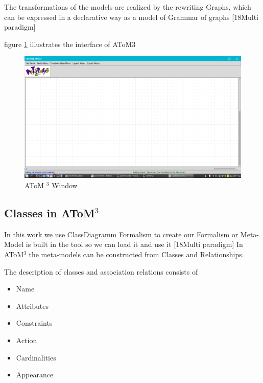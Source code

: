  The transformations of the models are realized by the rewriting
Graphs, which can be expressed in a declarative way as a model of
Grammar of graphs \cite{ch3-meta2}[18Multi paradigm]

 figure \ref{fig:AToM3 Window} illustrates the interface of AToM3 

\begin{figure}[th]
	\centering
		\includegraphics[scale=0.33]{Chapiter3/img/atom3}
	\caption{\label{fig:AToM3 Window}AToM $^{3}$ Window}
\end{figure} 
\pagebreak
\subsection{Classes in AToM$^{3}$ }
In this work we use ClassDiagramm Formalism to create  our Formalism 
or Meta-Model is built in the tool so we can load it and use  it
 \cite{ch3-meta2}[18Multi paradigm]
In AToM$^{3}$ the meta-models can be constructed from Classes and
Relationships.

The description of classes and association relations consists of

\begin{itemize}
\item  Name
\item  Attributes
\item  Constraints
\item  Action
\item  Cardinalities
\item  Appearance
\end{itemize}

